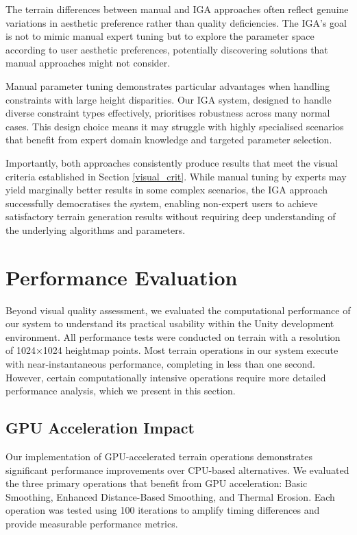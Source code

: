 The terrain differences between manual and IGA approaches often reflect genuine variations in aesthetic preference rather than quality deficiencies. The IGA's goal is not to mimic manual expert tuning but to explore the parameter space according to user aesthetic preferences, potentially discovering solutions that manual approaches might not consider.

Manual parameter tuning demonstrates particular advantages when handling constraints with large height disparities. Our IGA system, designed to handle diverse constraint types effectively, prioritises robustness across many normal cases. This design choice means it may struggle with highly specialised scenarios that benefit from expert domain knowledge and targeted parameter selection.

Importantly, both approaches consistently produce results that meet the visual criteria established in Section \ref{visual_crit}. While manual tuning by experts may yield marginally better results in some complex scenarios, the IGA approach successfully democratises the system, enabling non-expert users to achieve satisfactory terrain generation results without requiring deep understanding of the underlying algorithms and parameters.

\section{Performance Evaluation}
\label{performance_eval}

Beyond visual quality assessment, we evaluated the computational performance of our system to understand its practical usability within the Unity development environment. All performance tests were conducted on terrain with a resolution of 1024×1024 heightmap points. Most terrain operations in our system execute with near-instantaneous performance, completing in less than one second. However, certain computationally intensive operations require more detailed performance analysis, which we present in this section.

\subsection{GPU Acceleration Impact}

Our implementation of GPU-accelerated terrain operations demonstrates significant performance improvements over CPU-based alternatives. We evaluated the three primary operations that benefit from GPU acceleration: Basic Smoothing, Enhanced Distance-Based Smoothing, and Thermal Erosion. Each operation was tested using 100 iterations to amplify timing differences and provide measurable performance metrics.

